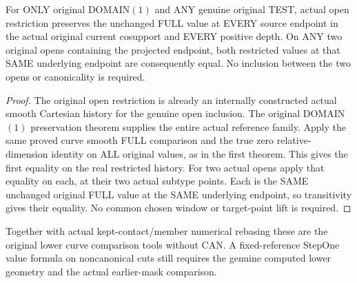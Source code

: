\begin{theorem}
\label{hir:original-curve-any-test-full-open-restriction}
\leanok
For ONLY original DOMAIN$(1)$ and ANY genuine original TEST, actual open
restriction preserves the unchanged FULL value at EVERY source endpoint
in the actual original current cosupport and EVERY positive depth. On
ANY two original opens containing the projected endpoint, both restricted
values at that SAME underlying endpoint are consequently equal. No
inclusion between the two opens or canonicality is required.
\end{theorem}
\begin{proof}
The original open restriction is already an internally constructed actual
smooth Cartesian history for the genuine open inclusion. The original
DOMAIN$(1)$ preservation theorem supplies the entire actual reference
family. Apply the same proved curve smooth FULL comparison and the true
zero relative-dimension identity on ALL original values, as in the first
theorem. This gives the first equality on the real restricted history.
For two actual opens apply that equality on each, at their two actual
subtype points. Each is the SAME unchanged original FULL value at the
SAME underlying endpoint, so transitivity gives their equality. No common
chosen window or target-point lift is required.
\end{proof}

Together with actual kept-contact/member numerical rebasing these are
the original lower curve comparison tools without CAN. A fixed-reference
StepOne value formula on noncanonical cuts still requires the genuine
computed lower geometry and the actual earlier-mask comparison.
